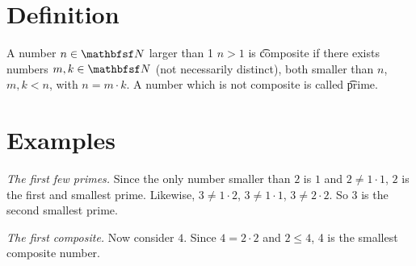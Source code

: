 
\section*{Definition}

A number $n \in \N  $ larger than 1 $n > 1$ is \t{composite} if there exists numbers $m, k \in \N  $ (not necessarily distinct), both smaller than $n$, $m, k < n$, with $n = m\cdot k$.
A number which is not composite is called \t{prime}.

\section*{Examples}

\textit{The first few primes.}
Since the only number smaller than $2$ is $1$ and $2 \neq 1\cdot 1$, $2$ is the first and smallest prime.
Likewise, $3 \neq 1\cdot 2$, $3 \neq 1\cdot 1$, $3 \neq 2\cdot 2$.
So $3$ is the second smallest prime.

\textit{The first composite.}
Now consider $4$.
Since $4 = 2\cdot 2$ and $2 \leq 4$, 4 is the smallest composite number.

\blankpage